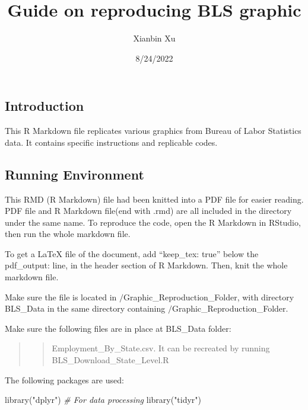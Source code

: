 \documentclass[
]{article}
\title{Guide on reproducing BLS graphic}
\author{Xianbin Xu}
\date{8/24/2022}
\newenvironment{Shaded}{\begin{snugshade}}{\end{snugshade}}
\newcommand{\CommentTok}[1]{\textcolor[rgb]{0.56,0.35,0.01}{\textit{#1}}}
\newcommand{\FunctionTok}[1]{\textcolor[rgb]{0.00,0.00,0.00}{#1}}
\newcommand{\NormalTok}[1]{#1}
\newcommand{\StringTok}[1]{\textcolor[rgb]{0.31,0.60,0.02}{#1}}
\begin{document}
\maketitle

\hypertarget{introduction}{%
\subsection{Introduction}\label{introduction}}

This R Markdown file replicates various graphics from Bureau of Labor
Statistics data. It contains specific instructions and replicable codes.

\hypertarget{running-environment}{%
\subsection{Running Environment}\label{running-environment}}

This RMD (R Markdown) file had been knitted into a PDF file for easier
reading. PDF file and R Markdown file(end with .rmd) are all included in
the directory under the same name. To reproduce the code, open the R
Markdown in RStudio, then run the whole markdown file.

To get a LaTeX file of the document, add ``keep\_tex: true'' below the
pdf\_output: line, in the header section of R Markdown. Then, knit the
whole markdown file.

Make sure the file is located in \(/\)Graphic\_Reproduction\_Folder,
with directory BLS\_Data in the same directory containing
\(/\)Graphic\_Reproduction\_Folder.

Make sure the following files are in place at BLS\_Data folder:

\begin{quote}
\begin{quote}
Employment\_By\_State.csv. It can be recreated by running
BLS\_Download\_State\_Level.R
\end{quote}
\end{quote}

The following packages are used:

\begin{Shaded}
\begin{Highlighting}[]
\FunctionTok{library}\NormalTok{(}\StringTok{"dplyr"}\NormalTok{) }\CommentTok{\# For data processing}
\FunctionTok{library}\NormalTok{(}\StringTok{"tidyr"}\NormalTok{)}
\end{Highlighting}
\end{Shaded}
\end{document}
